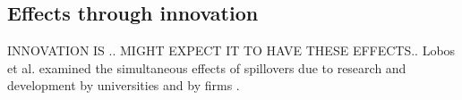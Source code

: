 \documentclass[a4paper]{article}
\theoremstyle{definition}
\theoremstyle{plain}
\begin{document}
{%






         


\subsection{Effects through innovation}
INNOVATION IS .. MIGHT EXPECT IT TO HAVE THESE EFFECTS.. 
Lobos et al. examined the simultaneous effects of spillovers due to research and development by universities and by firms \cite{belderbosWhatSpilloversUniversities2022}.

}
\end{document}
